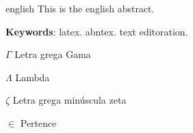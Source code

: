 \documentclass[
	12pt,				%
	openright,			%
	oneside,			%
	a4paper,			%
	english,			%
	brazil				%
	]{abntex2}
\begin{document}
\begin{resumo}[Abstract]
 \begin{otherlanguage*}{english}
   This is the english abstract.

   \vspace{\onelineskip}
 
   \noindent 
   \textbf{Keywords}: latex. abntex. text editoration.
 \end{otherlanguage*}
\end{resumo}

\listoffigures*
\cleardoublepage

\listoftables*
\cleardoublepage

\begin{simbolos}
  \item[$ \Gamma $] Letra grega Gama
  \item[$ \Lambda $] Lambda
  \item[$ \zeta $] Letra grega minúscula zeta
  \item[$ \in $] Pertence
\end{simbolos}

\tableofcontents*
\cleardoublepage



\textual
\end{document}
